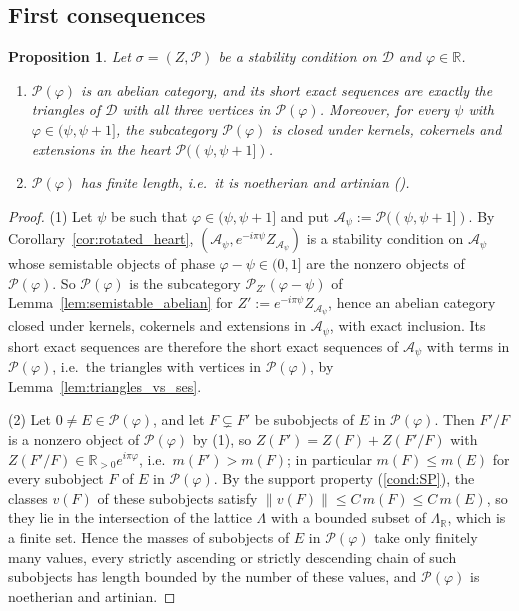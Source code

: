 \documentclass[12pt]{amsart}
\newcommand{\condref}[1]{\textup{(\ref{#1})}}
\newtheorem{proposition}[theorem]{Proposition}
\numberwithin{theorem}{section}
\theoremstyle{definition}
\newcommand{\RR}{\mathbb{R}}
\newcommand{\calA}{\mathcal{A}}
\newcommand{\calP}{\mathcal{P}}
\newcommand{\calD}{\mathcal{D}}
\begin{document}
	\subsection{First consequences}

	\begin{proposition}
		\label{prop:slice_abelian}
		Let $\sigma = (Z, \calP)$ be a stability condition on $\calD$ and $\varphi \in \RR$.
		\begin{enumerate}
			\item $\calP(\varphi)$ is an abelian category, and its short exact sequences are exactly the triangles of $\calD$ with all three vertices in $\calP(\varphi)$.
			Moreover, for every $\psi$ with $\varphi \in (\psi, \psi + 1]$, the subcategory $\calP(\varphi)$ is closed under kernels, cokernels and extensions in the heart $\calP((\psi, \psi + 1])$.
			\item $\calP(\varphi)$ has finite length, i.e.\ it is noetherian and artinian (\cite[Exercise~5.9]{MS17}).
		\end{enumerate}
	\end{proposition}

	\begin{proof}
		(1) Let $\psi$ be such that $\varphi \in (\psi, \psi + 1]$ and put $\calA_{\psi} := \calP((\psi, \psi + 1])$.
		By Corollary~\ref{cor:rotated_heart}, $(\calA_{\psi}, e^{-i \pi \psi} Z_{\calA_{\psi}})$ is a stability condition on $\calA_{\psi}$ whose semistable objects of phase $\varphi - \psi \in (0, 1]$ are the nonzero objects of $\calP(\varphi)$.
		So $\calP(\varphi)$ is the subcategory $\calP_{Z'}(\varphi - \psi)$ of Lemma~\ref{lem:semistable_abelian} for $Z' := e^{-i \pi \psi} Z_{\calA_{\psi}}$, hence an abelian category closed under kernels, cokernels and extensions in $\calA_{\psi}$, with exact inclusion.
		Its short exact sequences are therefore the short exact sequences of $\calA_{\psi}$ with terms in $\calP(\varphi)$, i.e.\ the triangles with vertices in $\calP(\varphi)$, by Lemma~\ref{lem:triangles_vs_ses}.

		(2) Let $0 \neq E \in \calP(\varphi)$, and let $F \subsetneq F'$ be subobjects of $E$ in $\calP(\varphi)$.
		Then $F' / F$ is a nonzero object of $\calP(\varphi)$ by (1), so $Z(F') = Z(F) + Z(F' / F)$ with $Z(F' / F) \in \RR_{>0} e^{i \pi \varphi}$, i.e.\ $m(F') > m(F)$;
		in particular $m(F) \leqslant m(E)$ for every subobject $F$ of $E$ in $\calP(\varphi)$.
		By the support property \condref{cond:SP}, the classes $v(F)$ of these subobjects satisfy $\| v(F) \| \leqslant C \, m(F) \leqslant C \, m(E)$, so they lie in the intersection of the lattice $\Lambda$ with a bounded subset of $\Lambda_{\RR}$, which is a finite set.
		Hence the masses of subobjects of $E$ in $\calP(\varphi)$ take only finitely many values, every strictly ascending or strictly descending chain of such subobjects has length bounded by the number of these values, and $\calP(\varphi)$ is noetherian and artinian.
	\end{proof}
\end{document}
